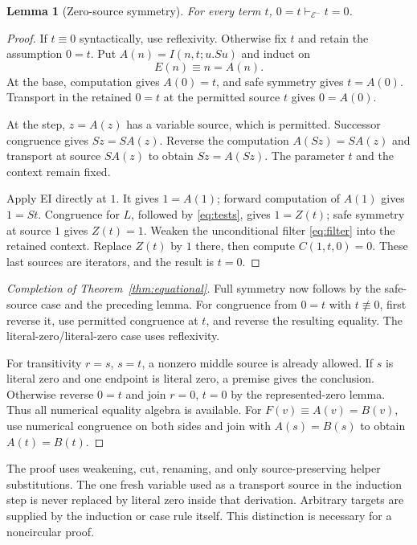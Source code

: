 \documentclass[11pt,letterpaper]{article}
\newtheorem{lemma}[theorem]{Lemma}
\theoremstyle{definition}
\newcommand{\EE}{\mathcal E^{-}}
\newcommand{\synneq}{\not\equiv}
\begin{document}
\begin{lemma}[Zero-source symmetry]
For every term $t$, $0=t\vdash_{\EE}t=0$.
\end{lemma}
\begin{proof}
If $t\equiv0$ syntactically, use reflexivity. Otherwise fix $t$ and retain the
assumption $0=t$. Put $A(n)=I(n,t;u.Su)$ and induct on
\[
 E(n)\equiv n=A(n).
\]
At the base, computation gives $A(0)=t$, and safe symmetry gives
$t=A(0)$. Transport in the retained $0=t$ at the permitted source $t$
gives $0=A(0)$.

At the step, $z=A(z)$ has a variable source, which is permitted.
Successor congruence gives $Sz=S A(z)$. Reverse the computation
$A(Sz)=S A(z)$ and transport at source $S A(z)$ to obtain $Sz=A(Sz)$.
The parameter $t$ and the context remain fixed.

Apply EI directly at $1$. It gives $1=A(1)$; forward computation of
$A(1)$ gives $1=St$. Congruence for $L$, followed by
\eqref{eq:tests}, gives $1=Z(t)$; safe symmetry at source $1$ gives
$Z(t)=1$. Weaken the unconditional filter \eqref{eq:filter} into the
retained context. Replace $Z(t)$ by $1$ there, then compute
$C(1,t,0)=0$. These last sources are iterators, and the result is $t=0$.
\end{proof}

\begin{proof}[Completion of Theorem~\ref{thm:equational}]
Full symmetry now follows by the safe-source case and the preceding lemma.
For congruence from $0=t$ with $t\synneq0$, first reverse it, use
permitted congruence at $t$, and reverse the resulting equality. The
literal-zero/literal-zero case uses reflexivity.

For transitivity $r=s$, $s=t$, a nonzero middle source is already allowed.
If $s$ is literal zero and one endpoint is literal zero, a premise gives
the conclusion. Otherwise reverse $0=t$ and join $r=0$, $t=0$ by the
represented-zero lemma. Thus all numerical equality algebra is available.
For $F(v)\equiv A(v)=B(v)$, use numerical congruence on both sides and
join with $A(s)=B(s)$ to obtain $A(t)=B(t)$.
\end{proof}

The proof uses weakening, cut, renaming, and only source-preserving helper
substitutions. The one fresh variable used as a transport source in the
induction step is never replaced by literal zero inside that derivation.
Arbitrary targets are supplied by the induction or case rule itself. This
distinction is necessary for a noncircular proof.
\end{document}
